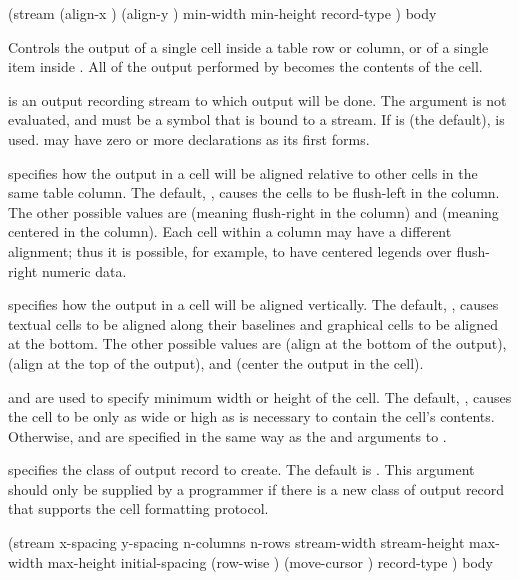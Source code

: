  {(\optional stream
                              \key (align-x ) (align-y )
                                   min-width min-height record-type \allow)
                             \body body}

Controls the output of a single cell inside a table row or column, or of a
single item inside .  All of the output performed by
 becomes the contents of the cell.

 is an output recording stream to which output will be done.  The
 argument is not evaluated, and must be a symbol that is bound to a
stream.  If  is  (the default),  is
used.   may have zero or more declarations as its first forms.

 specifies how the output in a cell will be aligned relative to
other cells in the same table column.  The default, , causes the cells
to be flush-left in the column.  The other possible values are 
(meaning flush-right in the column) and  (meaning centered in the
column).  Each cell within a column may have a different alignment; thus it is
possible, for example, to have centered legends over flush-right numeric data.

 specifies how the output in a cell will be aligned vertically.
The default, , causes textual cells to be aligned along their
baselines and graphical cells to be aligned at the bottom.  The other possible
values are  (align at the bottom of the output),  (align at
the top of the output), and  (center the output in the cell).

 and  are used to specify minimum width or height
of the cell.  The default, , causes the cell to be only as wide or high
as is necessary to contain the cell's contents.  Otherwise,  and
 are specified in the same way as the  and
 arguments to .

 specifies the class of output record to create.  The default
is .  This argument should only be supplied by
a programmer if there is a new class of output record that supports the cell
formatting protocol.


 {(\optional stream
                                   \key x-spacing y-spacing
                                        n-columns n-rows
                                        stream-width stream-height max-width max-height
                                        initial-spacing (row-wise )
                                        (move-cursor ) record-type \allow)
                                  \body body}

